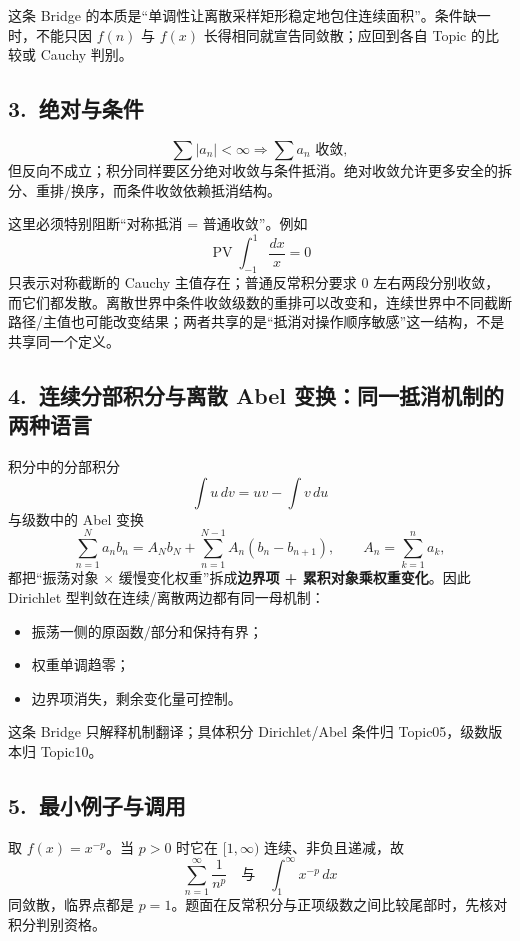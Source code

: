 \documentclass[UTF8,a4paper,10pt]{ctexart}
\begin{document}
\begin{center}

\end{center}

这条 Bridge 的本质是“单调性让离散采样矩形稳定地包住连续面积”。条件缺一时，不能只因 $f(n)$ 与 $f(x)$ 长得相同就宣告同敛散；应回到各自 Topic 的比较或 Cauchy 判别。

\subsection*{3.\ 绝对与条件}
\[
\sum \lvert a_n\rvert<\infty\Rightarrow\sum a_n\text{ 收敛},
\]
但反向不成立；积分同样要区分绝对收敛与条件抵消。绝对收敛允许更多安全的拆分、重排/换序，而条件收敛依赖抵消结构。

这里必须特别阻断“对称抵消 = 普通收敛”。例如
\[
\operatorname{PV}\int_{-1}^{1}\frac{dx}{x}=0
\]
只表示对称截断的 Cauchy 主值存在；普通反常积分要求 $0$ 左右两段分别收敛，而它们都发散。离散世界中条件收敛级数的重排可以改变和，连续世界中不同截断路径/主值也可能改变结果；两者共享的是“抵消对操作顺序敏感”这一结构，不是共享同一个定义。

\subsection*{4.\ 连续分部积分与离散 Abel 变换：同一抵消机制的两种语言}
积分中的分部积分
\[
\int u\,dv=uv-\int v\,du
\]
与级数中的 Abel 变换
\[
\sum_{n=1}^{N}a_nb_n
=A_Nb_N+\sum_{n=1}^{N-1}A_n(b_n-b_{n+1}),
\qquad A_n=\sum_{k=1}^{n}a_k,
\]
都把“振荡对象 $\times$ 缓慢变化权重”拆成\textbf{边界项 + 累积对象乘权重变化}。因此 Dirichlet 型判敛在连续/离散两边都有同一母机制：
\begin{itemize}
  \item 振荡一侧的原函数/部分和保持有界；
  \item 权重单调趋零；
  \item 边界项消失，剩余变化量可控制。
\end{itemize}
这条 Bridge 只解释机制翻译；具体积分 Dirichlet/Abel 条件归 Topic05，级数版本归 Topic10。

\subsection*{5.\ 最小例子与调用}
取 $f(x)=x^{-p}$。当 $p>0$ 时它在 $[1,\infty)$ 连续、非负且递减，故
\[
\sum_{n=1}^{\infty}\frac1{n^p}\quad\text{与}\quad
\int_1^\infty x^{-p}\,dx
\]
同敛散，临界点都是 $p=1$。题面在反常积分与正项级数之间比较尾部时，先核对积分判别资格。
\end{document}
